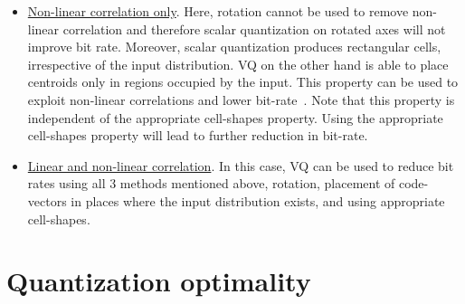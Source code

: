 \begin{Body}
\begin{enumerate}
\begin{itemize}
\item \underline{Non-linear correlation only}.  Here, rotation cannot be used to remove non-linear correlation and therefore scalar quantization on rotated axes will not improve bit rate.  Moreover, scalar quantization produces rectangular cells, irrespective of the input distribution.  VQ on the other hand is able to place centroids only in regions occupied by the input.  This property can be used to exploit non-linear correlations and lower bit-rate~\cite{1985_JNL_VQ_Makhoul}.  Note that this property is independent of the appropriate cell-shapes property.  Using the appropriate cell-shapes property will lead to further reduction in bit-rate.

\item \underline{Linear and non-linear correlation}.  In this case, VQ can be used to reduce bit rates using all 3 methods mentioned above, rotation, placement of code-vectors in places where the input distribution exists, and using appropriate cell-shapes.
\end{itemize}

\end{enumerate}



\section{Quantization optimality}
\label{sec:quantization_optimality}



\end{Body}
